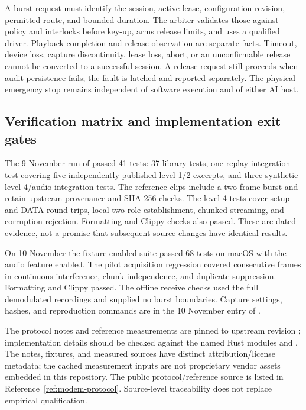 A burst request must identify the session, active lease, configuration
revision, permitted route, and bounded duration. The arbiter validates those
against policy and interlocks before key-up, arms release limits, and uses a
qualified driver. Playback completion and release observation are separate
facts. Timeout, device loss, capture discontinuity, lease loss, abort, or an
unconfirmable release cannot be converted to a successful session. A release
request still proceeds when audit persistence fails; the fault is latched and
reported separately. The physical emergency stop remains independent of
software execution and of either AI host.


\subsection{Verification matrix and implementation exit gates}
The 9 November run of  passed 41 tests:
37 library tests, one replay integration test covering five independently
published level-1/2 excerpts, and three synthetic level-4/audio integration
tests. The reference clips include a two-frame burst and retain upstream
provenance and SHA-256 checks. The level-4 tests cover setup and DATA round
trips, local two-role establishment, chunked streaming, and corruption
rejection. Formatting and Clippy checks also passed. These are dated evidence,
not a promise that subsequent source changes have identical results.

On 10 November the fixture-enabled suite passed 68 tests on macOS
with the audio feature enabled. The pilot acquisition regression
covered consecutive frames in continuous interference, chunk independence,
and duplicate suppression. Formatting and Clippy passed. The offline
receive checks used the full demodulated recordings and supplied no burst
boundaries. Capture settings, hashes, and reproduction commands are in the
10 November entry of .

The protocol notes and reference measurements are pinned to upstream revision
; implementation details should
be checked against the named Rust modules and .
The notes, fixtures, and measured sources have distinct attribution/license
metadata; the cached measurement inputs are not proprietary vendor assets
embedded in this repository. The public protocol/reference source is listed
in Reference~\ref{ref:modem-protocol}. Source-level traceability does not
replace empirical qualification.

